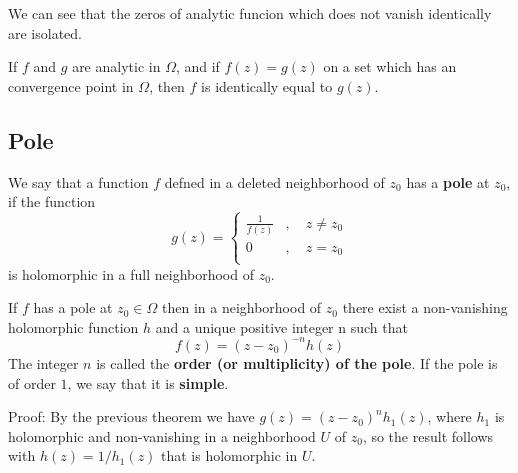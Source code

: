 \documentclass[12pt, oneside]{book}
\begin{document}
\begin{corollary}
    We can see that the zeros of analytic funcion which does not vanish identically are isolated.
\end{corollary}
\begin{corollary}[Uniqueness]
    If $f$ and $g$ are analytic in $\Omega$, and if $f(z)=g(z)$ on a set which has an convergence point in $\Omega$, then $f$ is identically equal to $g(z)$.
\end{corollary}

\subsection{Pole}

\begin{definition}
    We say that a function $f$ defned in a deleted neighborhood of $z_0$ has a \textbf{pole} at $z_0$, if the function
    \begin{equation*}
        g(z)
        =
        \begin{cases}
            \frac{1}{f(z)} & , \quad z\neq z_0 \\
            0              & ,\quad z=z_0      \\
        \end{cases}
    \end{equation*}
    is holomorphic in a full neighborhood of $z_0$.
\end{definition}

\begin{theorem}
    If $f$ has a pole at $z_0\in \Omega$ then in a neighborhood of $z_0$ there exist a non-vanishing holomorphic function $h$ and a unique positive integer n such that
    $$f(z)=(z-z_0)^{-n}h(z)$$
    The integer $n$ is called the \textbf{order (or multiplicity) of the pole}. If the pole is of order $1$, we say that it is \textbf{simple}.

    Proof:
    By the previous theorem we have $g(z)=(z-z_0)^nh_1(z)$, where $h_1$ is holomorphic and non-vanishing in a neighborhood $U$ of $z_0$, so the result follows with $h(z)=1/h_1(z)$ that is holomorphic in $U$.
\end{theorem}
\end{document}
